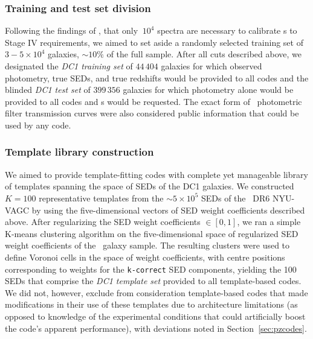 \subsubsection{Training and test set division}
\label{sec:buzztraining}

Following the findings of \citet{Bernstein:10}, \citet{Masters:2017} that only $~10^{4}$ spectra are necessary to calibrate \pz s to Stage IV requirements, we aimed to set aside a randomly selected training set of $3-5\times 10^{4}$ galaxies, $\sim 10\%$ of the full sample.
After all cuts described above, we designated the \textit{DC1 training set} of $44\,404$ galaxies for which observed photometry, true SEDs, and true redshifts would be provided to all codes and the blinded \textit{DC1 test set} of $399\,356$ galaxies for which photometry alone would be provided to all codes and \pzpdf s would be requested.
The exact form of \lsst\ photometric filter transmission curves were also considered public information that could be used by any code.

\subsubsection{Template library construction}
\label{sec:buzztemplates}

We aimed to provide template-fitting codes with complete yet manageable library of templates spanning the space of SEDs of the DC1 galaxies.
We constructed $K=100$ representative templates from the $\sim 5 \times 10^{5}$ SEDs of the \sdss\ DR6 NYU-VAGC by using the five-dimensional vectors of SED weight coefficients described above.
After regularizing the SED weight coefficients $\in [0, 1]$, we ran a simple K-means clustering algorithm on the five-dimensional space of regularized SED weight coefficients of the \sdss\ galaxy sample.
The resulting clusters were used to define Voronoi cells in the space of weight coefficients, with centre positions corresponding to weights for the \texttt{k-correct} SED components, yielding the 100 SEDs that comprise the \textit{DC1 template set} provided to all template-based codes.
We did not, however, exclude from consideration template-based codes that made modifications in their use of these templates due to architecture limitations (as opposed to knowledge of the experimental conditions that could artificially boost the code's apparent performance), with deviations noted in Section~\ref{sec:pzcodes}.
